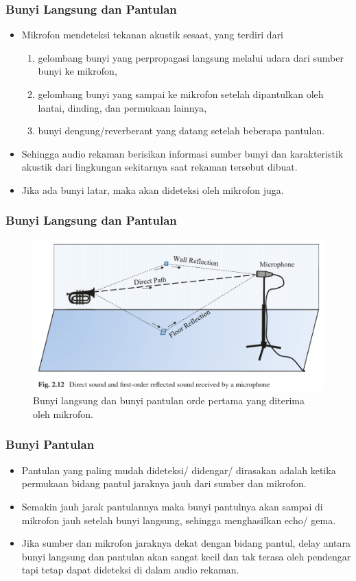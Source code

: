 \documentclass[pdflatex,compress]{beamer}
\begin{document}
\begin{frame}
	\frametitle{Bunyi Langsung dan Pantulan}
	\begin{itemize}
		\item Mikrofon mendeteksi tekanan akustik sesaat, yang terdiri dari
		\begin{enumerate}
			\item gelombang bunyi yang perpropagasi langsung melalui udara dari sumber bunyi ke mikrofon,
			\item gelombang bunyi yang sampai ke mikrofon setelah dipantulkan oleh lantai, dinding, dan permukaan lainnya,
			\item bunyi dengung/reverberant yang datang setelah beberapa pantulan.
		\end{enumerate}
		\item Sehingga audio rekaman berisikan informasi sumber bunyi dan karakteristik akustik dari lingkungan sekitarnya saat rekaman tersebut dibuat.
		\item Jika ada bunyi latar, maka akan dideteksi oleh mikrofon juga.
	\end{itemize}
\end{frame}

\begin{frame}
	\frametitle{Bunyi Langsung dan Pantulan}
	\begin{figure}
		\centering
		\includegraphics[width=\linewidth]{img/img012}
		\caption{Bunyi langsung dan bunyi pantulan orde pertama yang diterima oleh mikrofon.}
		\label{fig:img012}
	\end{figure}
\end{frame}

\begin{frame}
	\frametitle{Bunyi Pantulan}
	\begin{itemize}
		\item Pantulan yang paling mudah dideteksi/ didengar/ dirasakan adalah ketika permukaan bidang pantul jaraknya jauh dari sumber dan mikrofon.
		\item Semakin jauh jarak pantulannya maka bunyi pantulnya akan sampai di mikrofon jauh setelah bunyi langsung, sehingga menghasilkan echo/ gema.
		\item Jika sumber dan mikrofon jaraknya dekat dengan bidang pantul, delay antara bunyi langsung dan pantulan akan sangat kecil dan tak terasa oleh pendengar tapi tetap dapat dideteksi di dalam audio rekaman.
	\end{itemize}
\end{frame}
\end{document}
